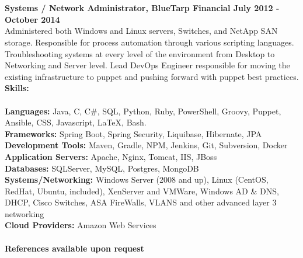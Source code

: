 \documentclass[10pt]{article}
\begin{document}
\\
\\
\textbf{Systems / Network Administrator, BlueTarp Financial \hfill{July 2012 - October 2014}}\\
\normalsize Administered both Windows and Linux servers, Switches, and NetApp SAN storage. Responsible for process automation through various scripting languages. Troubleshooting systems at every level of the
environment from Desktop to Networking and Server level. Lead DevOps Engineer responsible for moving the existing infrastructure to puppet and pushing forward with puppet best practices.
\\
\noindent\Large\textbf{Skills:}\\
\\
\normalsize
\textbf{Languages:}
\normalsize Java, C, C{\#}, SQL, Python, Ruby, PowerShell, Groovy, Puppet, Ansible, CSS, Javascript, LaTeX, Bash. \\
\textbf{Frameworks:}
\normalsize Spring Boot, Spring Security, Liquibase, Hibernate, JPA \\
\textbf{Development Tools:}
\normalsize Maven, Gradle, NPM, Jenkins, Git, Subversion, Docker \\
\textbf{Application Servers:}
\normalsize Apache, Nginx, Tomcat, IIS, JBoss \\
\textbf{Databases:}
\normalsize SQLServer, MySQL, Postgres, MongoDB \\
\textbf{Systems/Networking:}
\normalsize Windows Server (2008 and up), Linux (CentOS, RedHat, Ubuntu, included), XenServer and VMWare, Windows AD \& DNS, DHCP, 
Cisco Switches, ASA FireWalls, VLANS and other advanced layer 3 networking \\
\textbf{Cloud Providers:}
\normalsize Amazon Web Services
\\
\\
\noindent\Large\textbf{References available upon request}
\end{document}

